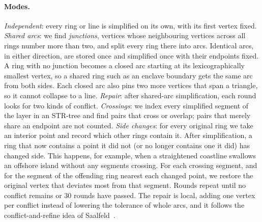 \documentclass[11pt]{article}
\begin{document}
\paragraph{Modes.}
\emph{Independent}: every ring or line is simplified on its own, with its first
vertex fixed. \emph{Shared arcs}: we find \emph{junctions}, vertices whose
neighbouring vertices across all rings number more than two, and split every
ring there into arcs. Identical arcs, in either direction, are stored once and
simplified once with their endpoints fixed. A ring with no junction becomes a
closed arc starting at its lexicographically smallest vertex, so a shared ring
such as an enclave boundary gets the same arc from both sides. Each closed arc
also pins two more vertices that span a triangle, so it cannot collapse to a
line. \emph{Repair}: after shared-arc simplification, each round looks for two
kinds of conflict. \emph{Crossings}: we index every simplified segment of the
layer in an STR-tree and find pairs that cross or overlap; pairs that merely
share an endpoint are not counted. \emph{Side changes}: for every original
ring we take an interior point and record which other rings contain it. After
simplification, a ring that now contains a point it did not (or no longer
contains one it did) has changed side. This happens, for example, when a
straightened coastline swallows an offshore island without any segments
crossing. For each crossing segment, and for the segment of the offending ring
nearest each changed point, we restore the original vertex that deviates most
from that segment. Rounds repeat until no conflict remains or 30 rounds have
passed. The repair is local, adding one vertex per conflict instead of lowering
the tolerance of whole arcs, and it follows the conflict-and-refine idea of
Saalfeld~\citep{saalfeld1999}.
\end{document}
